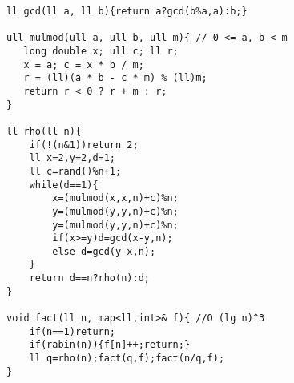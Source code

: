 \begin{verbatim}
ll gcd(ll a, ll b){return a?gcd(b%a,a):b;}

ull mulmod(ull a, ull b, ull m){ // 0 <= a, b < m
   long double x; ull c; ll r;
   x = a; c = x * b / m;
   r = (ll)(a * b - c * m) % (ll)m;
   return r < 0 ? r + m : r;
}

ll rho(ll n){
    if(!(n&1))return 2;
    ll x=2,y=2,d=1;
    ll c=rand()%n+1;
    while(d==1){
        x=(mulmod(x,x,n)+c)%n;
        y=(mulmod(y,y,n)+c)%n;
        y=(mulmod(y,y,n)+c)%n;
        if(x>=y)d=gcd(x-y,n);
        else d=gcd(y-x,n);
    }
    return d==n?rho(n):d;
}

void fact(ll n, map<ll,int>& f){ //O (lg n)^3
	if(n==1)return;
	if(rabin(n)){f[n]++;return;}
	ll q=rho(n);fact(q,f);fact(n/q,f);
}
\end{verbatim}